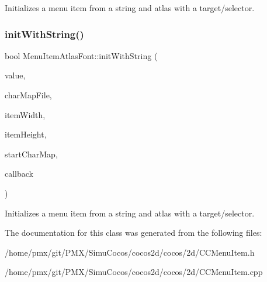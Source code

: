 Initializes a menu item from a string and atlas with a target/selector. \mbox{\label{classMenuItemAtlasFont_a72356ec71430cdd8b632e28bd8ec47d5}} 
\subsubsection{\texorpdfstring{init\+With\+String()}{initWithString()}\hspace{0.1cm}{\footnotesize\ttfamily [2/2]}}
{\footnotesize\ttfamily bool Menu\+Item\+Atlas\+Font\+::init\+With\+String (\begin{DoxyParamCaption}\item[{const std\+::string \&}]{value,  }\item[{const std\+::string \&}]{char\+Map\+File,  }\item[{int}]{item\+Width,  }\item[{int}]{item\+Height,  }\item[{char}]{start\+Char\+Map,  }\item[{const cc\+Menu\+Callback \&}]{callback }\end{DoxyParamCaption})}

Initializes a menu item from a string and atlas with a target/selector. 

The documentation for this class was generated from the following files\+:\begin{DoxyCompactItemize}
\item 
/home/pmx/git/\+P\+M\+X/\+Simu\+Cocos/cocos2d/cocos/2d/C\+C\+Menu\+Item.\+h\item 
/home/pmx/git/\+P\+M\+X/\+Simu\+Cocos/cocos2d/cocos/2d/C\+C\+Menu\+Item.\+cpp\end{DoxyCompactItemize}
